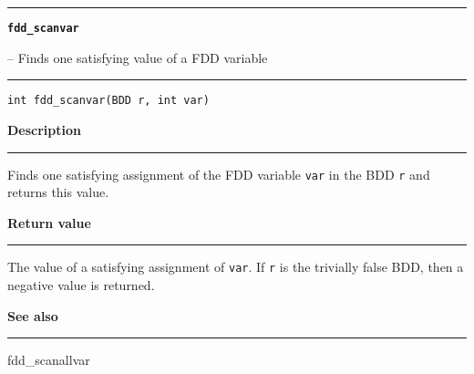 \begin{minipage}{\textwidth}

\noindent\begin{minipage}{\textwidth}
\rule{\textwidth}{0.5mm}
{\tt\bf fdd\_scanvar }
\--- Finds one satisfying value of a FDD variable  \hspace{\fill}
\\\rule[1.5ex]{\textwidth}{0.5mm}
\end{minipage}

\noindent\begin{verbatim}
int fdd_scanvar(BDD r, int var) 
\end{verbatim}

\vspace{\parsep}\noindent
{\bf Description}\\\rule[1.5ex]{\textwidth}{0.2mm}\vspace{-1.5ex}\setlength{\parindent}{1em}
Finds one satisfying assignment of the FDD variable {\tt var} in the
           BDD {\tt r} and returns this value. 

\setlength{\parindent}{0em}\vspace{\parsep}\vspace{\baselineskip}\noindent
{\bf Return value}\\\rule[1.5ex]{\textwidth}{0.2mm}\vspace{-1.5ex}
The value of a satisfying assignment of {\tt var}. If {\tt r} is
           the trivially false BDD, then a negative value is returned. 

\vspace{\parsep}\vspace{\baselineskip}\noindent
{\bf See also}\\\rule[1.5ex]{\textwidth}{0.2mm}\vspace{-1.5ex}
fdd\_scanallvar 
\end{minipage}
\vspace{8ex}
